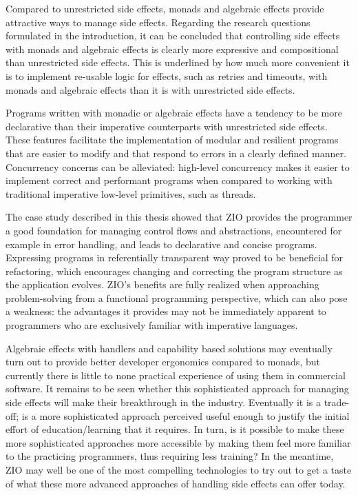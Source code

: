 Compared to unrestricted side effects, monads and algebraic effects provide attractive ways to manage side effects. Regarding the research questions formulated in the introduction, it can be concluded that controlling side effects with monads and algebraic effects is clearly more expressive and compositional than unrestricted side effects. This is underlined by how much more convenient it is to implement re-usable logic for effects, such as retries and timeouts, with monads and algebraic effects than it is with unrestricted side effects.

Programs written with monadic or algebraic effects have a tendency to be more declarative than their imperative counterparts with unrestricted side effects. These features facilitate the implementation of modular and resilient programs that are easier to modify and that respond to errors in a clearly defined manner. Concurrency concerns can be alleviated: high-level concurrency makes it easier to implement correct and performant programs when compared to working with traditional imperative low-level primitives, such as threads.

The case study described in this thesis showed that ZIO provides the programmer a good foundation for managing control flows and abstractions, encountered for example in error handling, and leads to declarative and concise programs. Expressing programs in referentially transparent way proved to be beneficial for refactoring, which encourages changing and correcting the program structure as the application evolves. ZIO's benefits are fully realized when approaching problem-solving from a functional programming perspective, which can also pose a weakness: the advantages it provides may not be immediately apparent to programmers who are exclusively familiar with imperative languages.

Algebraic effects with handlers and capability based solutions may eventually turn out to provide better developer ergonomics compared to monads, but currently there is little to none practical experience of using them in commercial software. It remains to be seen whether this sophisticated approach for managing side effects will make their breakthrough in the industry. Eventually it is a trade-off; is a more sophisticated approach perceived useful enough to justify the initial effort of education/learning that it requires. In turn, is it possible to make these more sophisticated approaches more accessible by making them feel more familiar to the practicing programmers, thus requiring less training? In the meantime, ZIO may well be one of the most compelling technologies to try out to get a taste of what these more advanced approaches of handling side effects can offer today.
